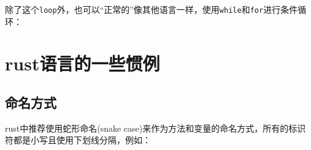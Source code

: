 \documentclass[12pt]{article}
\begin{document}
除了这个\texttt{loop}外，也可以``正常的''像其他语言一样，使用\texttt{while}和\texttt{for}进行条件循环：

\begin{Shaded}
\begin{Highlighting}[]
\OperatorTok{\textless{}}  \OperatorTok{\{}    
\OperatorTok{+=} \OperatorTok{;}
\OperatorTok{\}}

\OperatorTok{\{} 
    \NormalTok{(}\OperatorTok{,}\OperatorTok{;} 
\OperatorTok{\}}

\NormalTok{ (}\NormalTok{) }\OperatorTok{\{}
    \NormalTok{(}\OperatorTok{,}\OperatorTok{;}
\OperatorTok{\}}
\end{Highlighting}
\end{Shaded}

\section{rust语言的一些惯例}\label{rustux8bedux8a00ux7684ux4e00ux4e9bux60efux4f8b}

\subsection{命名方式}\label{ux547dux540dux65b9ux5f0f}

rust中推荐使用蛇形命名(snake case)来作为方法和变量的命名方式，所有的标识符都是小写且使用下划线分隔，例如：

\begin{Shaded}
\begin{Highlighting}[]
\OperatorTok{=} \OperatorTok{;}

\OperatorTok{\{}

\OperatorTok{\}}
\end{Highlighting}
\end{Shaded}
\end{document}
